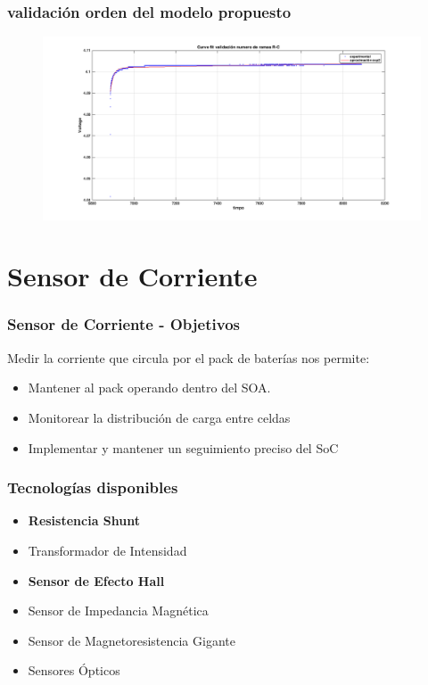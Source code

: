 \documentclass[10pt]{beamer}
\theoremstyle{remark}
\theoremstyle{definition}
\begin{document}
\begin{frame}
\frametitle{validación orden del modelo propuesto}

\begin{figure}
	\centering
\includegraphics[width=0.9\linewidth]{images/exp_ord_2_val.png}

\caption{}
\label{fig:val_exp2}

\end{figure}


\end{frame}



\section{Sensor de Corriente}

\begin{frame}[allowframebreaks]
	\frametitle{Sensor de Corriente - Objetivos}
	Medir la corriente que circula por el pack de baterías nos permite:
	\begin{itemize}
	  \item Mantener al pack operando dentro del SOA.
	  \item Monitorear la distribución de carga entre celdas
	  \item Implementar y mantener un seguimiento preciso del SoC
	\end{itemize}
\end{frame}

\begin{frame}[allowframebreaks]
\frametitle{Tecnologías disponibles}
	\begin{itemize}
	  \item \textbf{Resistencia Shunt}
	  \item Transformador de Intensidad
	  \item \textbf{Sensor de Efecto Hall}
	  \item Sensor de Impedancia Magnética
	  \item Sensor de Magnetoresistencia Gigante
	  \item Sensores Ópticos
	\end{itemize}
\end{frame}
\end{document}
